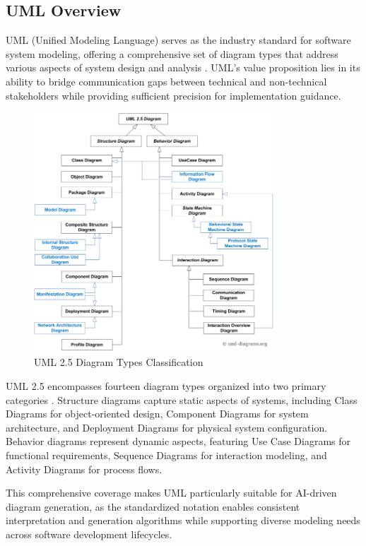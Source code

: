 \subsection{UML Overview}

UML (Unified Modeling Language) serves as the industry standard for software system modeling, offering a comprehensive set of diagram types that address various aspects of system design and analysis \cite{uml_specification}. UML's value proposition lies in its ability to bridge communication gaps between technical and non-technical stakeholders while providing sufficient precision for implementation guidance.

\begin{figure}[htbp]
\centering
\includegraphics[width=0.8\textwidth]{pictures/web/uml-25-diagrams.png}
\caption{UML 2.5 Diagram Types Classification}
\label{fig:uml_diagrams}
\end{figure}

UML 2.5 encompasses fourteen diagram types organized into two primary categories \cite{uml25_diagrams}. Structure diagrams capture static aspects of systems, including Class Diagrams for object-oriented design, Component Diagrams for system architecture, and Deployment Diagrams for physical system configuration. Behavior diagrams represent dynamic aspects, featuring Use Case Diagrams for functional requirements, Sequence Diagrams for interaction modeling, and Activity Diagrams for process flows.

This comprehensive coverage makes UML particularly suitable for AI-driven diagram generation, as the standardized notation enables consistent interpretation and generation algorithms while supporting diverse modeling needs across software development lifecycles.

